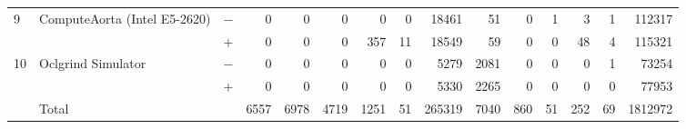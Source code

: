 \begin{tabular}{lll | rrrrrr | rrrrrr }
\hline
\multirow{ 2}{*}{9} & \multirow{ 2}{*}{ComputeAorta (Intel E5-2620)} & $-$ & 0 & 0 & 0 & 0 & 0 & 18461       & 51 & 0 & 1 & 3 & 1 & 112317 \\& & $+$ & 0 & 0 & 0 & 357 & 11 & 18549 & 59 & 0 & 0 & 48 & 4 & 115321 \\
\hline
\multirow{ 2}{*}{10} & \multirow{ 2}{*}{Oclgrind Simulator} & $-$ & 0 & 0 & 0 & 0 & 0 & 5279       & 2081 & 0 & 0 & 0 & 1 & 73254 \\& & $+$ & 0 & 0 & 0 & 0 & 0 & 5330 & 2265 & 0 & 0 & 0 & 0 & 77953 \\
  \midrule
  
\multirow{ 2}{*}{} & \multirow{ 2}{*}{Total} & \multirow{ 2}{*}{} &
\multirow{ 2}{*}{6557} & \multirow{ 2}{*}{6978} & \multirow{ 2}{*}{4719} & \multirow{ 2}{*}{1251} & \multirow{ 2}{*}{51} & \multirow{ 2}{*}{265319} & \multirow{ 2}{*}{7040} & \multirow{ 2}{*}{860} & \multirow{ 2}{*}{51} & \multirow{ 2}{*}{252} & \multirow{ 2}{*}{69} & \multirow{ 2}{*}{1812972} \\
\\

  \bottomrule
\end{tabular}

